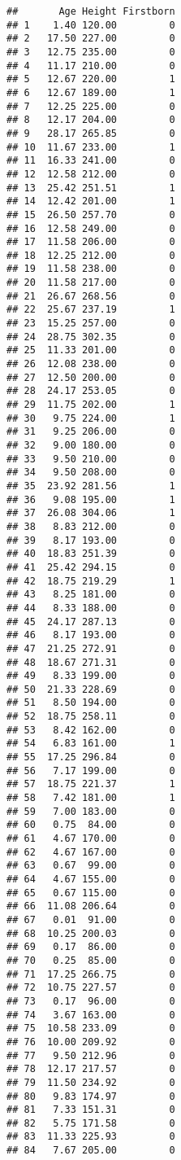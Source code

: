 \documentclass[
]{book}
\begin{document}
\begin{verbatim}
##       Age Height Firstborn
## 1    1.40 120.00         0
## 2   17.50 227.00         0
## 3   12.75 235.00         0
## 4   11.17 210.00         0
## 5   12.67 220.00         1
## 6   12.67 189.00         1
## 7   12.25 225.00         0
## 8   12.17 204.00         0
## 9   28.17 265.85         0
## 10  11.67 233.00         1
## 11  16.33 241.00         0
## 12  12.58 212.00         0
## 13  25.42 251.51         1
## 14  12.42 201.00         1
## 15  26.50 257.70         0
## 16  12.58 249.00         0
## 17  11.58 206.00         0
## 18  12.25 212.00         0
## 19  11.58 238.00         0
## 20  11.58 217.00         0
## 21  26.67 268.56         0
## 22  25.67 237.19         1
## 23  15.25 257.00         0
## 24  28.75 302.35         0
## 25  11.33 201.00         0
## 26  12.08 238.00         0
## 27  12.50 200.00         0
## 28  24.17 253.05         0
## 29  11.75 202.00         1
## 30   9.75 224.00         1
## 31   9.25 206.00         0
## 32   9.00 180.00         0
## 33   9.50 210.00         0
## 34   9.50 208.00         0
## 35  23.92 281.56         1
## 36   9.08 195.00         1
## 37  26.08 304.06         1
## 38   8.83 212.00         0
## 39   8.17 193.00         0
## 40  18.83 251.39         0
## 41  25.42 294.15         0
## 42  18.75 219.29         1
## 43   8.25 181.00         0
## 44   8.33 188.00         0
## 45  24.17 287.13         0
## 46   8.17 193.00         0
## 47  21.25 272.91         0
## 48  18.67 271.31         0
## 49   8.33 199.00         0
## 50  21.33 228.69         0
## 51   8.50 194.00         0
## 52  18.75 258.11         0
## 53   8.42 162.00         0
## 54   6.83 161.00         1
## 55  17.25 296.84         0
## 56   7.17 199.00         0
## 57  18.75 221.37         1
## 58   7.42 181.00         1
## 59   7.00 183.00         0
## 60   0.75  84.00         0
## 61   4.67 170.00         0
## 62   4.67 167.00         0
## 63   0.67  99.00         0
## 64   4.67 155.00         0
## 65   0.67 115.00         0
## 66  11.08 206.64         0
## 67   0.01  91.00         0
## 68  10.25 200.03         0
## 69   0.17  86.00         0
## 70   0.25  85.00         0
## 71  17.25 266.75         0
## 72  10.75 227.57         0
## 73   0.17  96.00         0
## 74   3.67 163.00         0
## 75  10.58 233.09         0
## 76  10.00 209.92         0
## 77   9.50 212.96         0
## 78  12.17 217.57         0
## 79  11.50 234.92         0
## 80   9.83 174.97         0
## 81   7.33 151.31         0
## 82   5.75 171.58         0
## 83  11.33 225.93         0
## 84   7.67 205.00         0

\end{verbatim}
\end{document}
